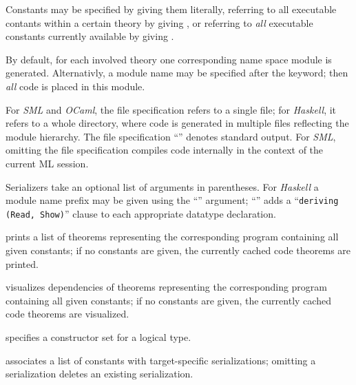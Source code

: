 \begin{isabellebody}
\begin{isamarkuptext}
\begin{description}
  Constants may be specified by giving them literally, referring to
  all executable contants within a certain theory by giving , or referring to \emph{all} executable constants currently
  available by giving \isa{{\isachardoublequote}{\isacharasterisk}{\isachardoublequote}}.

  By default, for each involved theory one corresponding name space
  module is generated.  Alternativly, a module name may be specified
  after the \hyperlink{keyword.module-name}{\mbox{}} keyword; then \emph{all} code is
  placed in this module.

  For \emph{SML} and \emph{OCaml}, the file specification refers to a
  single file; for \emph{Haskell}, it refers to a whole directory,
  where code is generated in multiple files reflecting the module
  hierarchy.  The file specification ``\isa{{\isachardoublequote}{\isacharminus}{\isachardoublequote}}'' denotes standard
  output.  For \emph{SML}, omitting the file specification compiles
  code internally in the context of the current ML session.

  Serializers take an optional list of arguments in parentheses.  For
  \emph{Haskell} a module name prefix may be given using the ``'' argument; ``'' adds a ``\verb|deriving (Read, Show)|'' clause to each appropriate datatype
  declaration.

  \item \hyperlink{command.HOL.code-thms}{\mbox{}} prints a list of theorems
  representing the corresponding program containing all given
  constants; if no constants are given, the currently cached code
  theorems are printed.

  \item \hyperlink{command.HOL.code-deps}{\mbox{}} visualizes dependencies of
  theorems representing the corresponding program containing all given
  constants; if no constants are given, the currently cached code
  theorems are visualized.

  \item \hyperlink{command.HOL.code-datatype}{\mbox{}} specifies a constructor set
  for a logical type.

  \item \hyperlink{command.HOL.code-const}{\mbox{}} associates a list of constants
  with target-specific serializations; omitting a serialization
  deletes an existing serialization.


\end{description}
\end{isamarkuptext}
\end{isabellebody}
